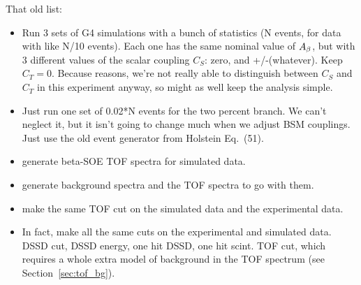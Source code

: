 That old list:
\begin{itemize}
	\item Run 3 sets of G4 simulations with a bunch of statistics (N events, for data with like N/10 events).  Each one has the same nominal value of $A_{\beta}$, but with 3 different values of the scalar coupling $C_S$:  zero, and +/-(whatever).  Keep $C_T=0$.  Because reasons, we're not really able to distinguish between $C_S$ and $C_T$ in this experiment anyway, so might as well keep the analysis simple.
	\item Just run one set of 0.02*N events for the two percent branch.  We can't neglect it, but it isn't going to change much when we adjust BSM couplings.  Just use the old event generator from Holstein Eq.~(51).
	\item generate beta-SOE TOF spectra for simulated data.  
	\item generate background spectra and the TOF spectra to go with them.
	\item make the same TOF cut on the simulated data and the experimental data.  
	\item In fact, make all the same cuts on the experimental and simulated data.  DSSD cut, DSSD energy, one hit DSSD, one hit scint.  TOF cut, which requires a whole extra model of background in the TOF spectrum (see Section~\ref{sec:tof_bg}).

\end{itemize}
